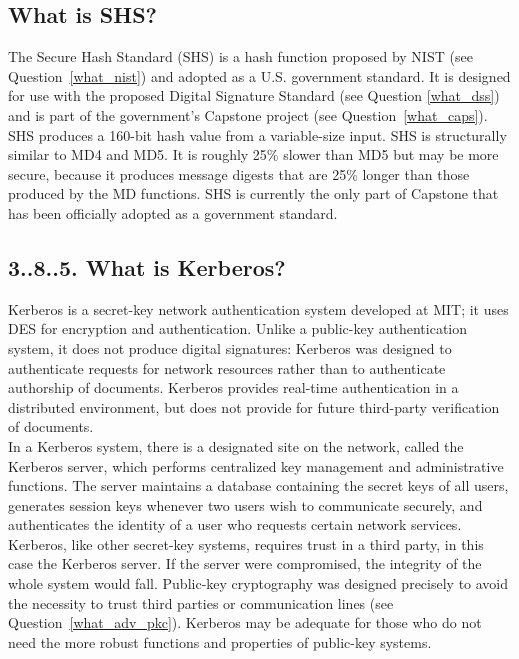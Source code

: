 \subsection{What is SHS?}
\label{what_shs}

The Secure Hash Standard (SHS) is a hash function proposed by NIST (see
Question~\ref{what_nist}) and adopted as a U.S. government standard. It is
designed for use with the proposed Digital Signature Standard (see Question
\ref{what_dss}) and is part of the government's Capstone project (see
Question~\ref{what_caps}).  SHS produces a 160-bit hash value from a
variable-size input. SHS is structurally similar to MD4 and MD5. It is
roughly 25\% slower than MD5 but may be more secure, because it produces
message digests that are 25\% longer than those produced by the MD
functions. SHS is currently the only part of Capstone that has been
officially adopted as a government standard.

\subsection{3..8..5. What is Kerberos?}

Kerberos is a secret-key network authentication system developed at
MIT; it uses DES for encryption and authentication. Unlike a public-key
authentication system, it does not produce digital signatures: Kerberos
was designed to authenticate requests for network resources rather than
to authenticate authorship of documents. Kerberos provides real-time
authentication in a distributed environment, but does not provide for
future third-party verification of documents.\\

In a Kerberos system, there is a designated site on the network, called
the Kerberos server, which performs centralized key management and
administrative functions. The server maintains a database containing
the secret keys of all users, generates session keys whenever two users
wish to communicate securely, and authenticates the identity of a user
who requests certain network services.\\

Kerberos, like other secret-key systems, requires trust in a third party,
in this case the Kerberos server. If the server were compromised, the
integrity of the whole system would fall. Public-key cryptography was
designed precisely to avoid the necessity to trust third parties or
communication lines (see Question~\ref{what_adv_pkc}). Kerberos may be
adequate for those who do not need the more robust functions and properties
of public-key systems.

